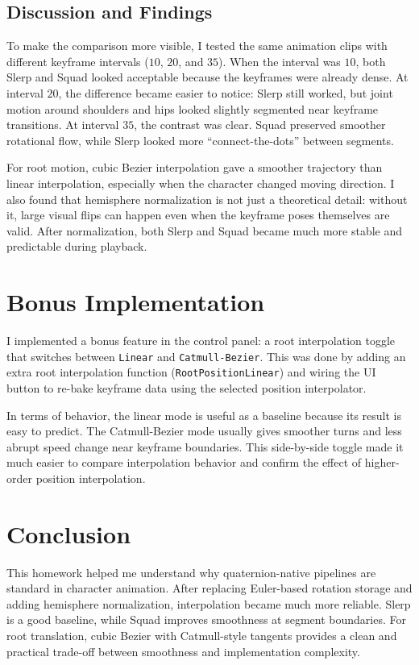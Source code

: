 \documentclass[11pt,a4paper]{article}
\begin{document}
\subsection{Discussion and Findings}
To make the comparison more visible, I tested the same animation clips with different keyframe intervals (\(10\), \(20\), and \(35\)).
When the interval was \(10\), both Slerp and Squad looked acceptable because the keyframes were already dense.
At interval \(20\), the difference became easier to notice: Slerp still worked, but joint motion around shoulders and hips looked slightly segmented near keyframe transitions.
At interval \(35\), the contrast was clear. Squad preserved smoother rotational flow, while Slerp looked more ``connect-the-dots'' between segments.

For root motion, cubic Bezier interpolation gave a smoother trajectory than linear interpolation, especially when the character changed moving direction.
I also found that hemisphere normalization is not just a theoretical detail: without it, large visual flips can happen even when the keyframe poses themselves are valid.
After normalization, both Slerp and Squad became much more stable and predictable during playback.

\section{Bonus Implementation}
I implemented a bonus feature in the control panel: a root interpolation toggle that switches between \texttt{Linear} and \texttt{Catmull-Bezier}.
This was done by adding an extra root interpolation function (\texttt{RootPositionLinear}) and wiring the UI button to re-bake keyframe data using the selected position interpolator.

In terms of behavior, the linear mode is useful as a baseline because its result is easy to predict.
The Catmull-Bezier mode usually gives smoother turns and less abrupt speed change near keyframe boundaries.
This side-by-side toggle made it much easier to compare interpolation behavior and confirm the effect of higher-order position interpolation.

\section{Conclusion}
This homework helped me understand why quaternion-native pipelines are standard in character animation.
After replacing Euler-based rotation storage and adding hemisphere normalization, interpolation became much more reliable.
Slerp is a good baseline, while Squad improves smoothness at segment boundaries.
For root translation, cubic Bezier with Catmull-style tangents provides a clean and practical trade-off between smoothness and implementation complexity.
\end{document}
